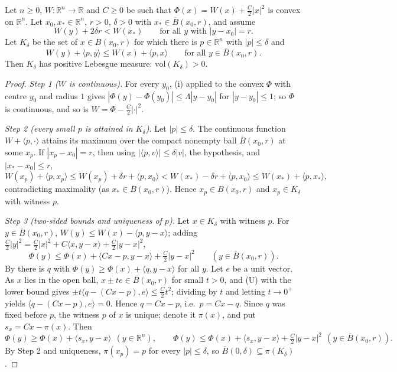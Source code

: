 \begin{lemma}
Let $n\ge0$, $W:\mathbb R^n\to\mathbb R$ and $C\ge0$ be such that $\Phi(x)=W(x)+\frac C2|x|^2$ is convex on $\mathbb R^n$. Let $x_0,x_*\in\mathbb R^n$, $r>0$, $\delta>0$ with $x_*\in\overline B(x_0,r)$, and assume
\[
W(y)+2\delta r<W(x_*)\qquad\text{for all }y\text{ with }|y-x_0|=r .
\]
Let $K_\delta$ be the set of $x\in B(x_0,r)$ for which there is $p\in\mathbb R^n$ with $|p|\le\delta$ and
\[
W(y)+\langle p,y\rangle\le W(x)+\langle p,x\rangle\qquad\text{for all }y\in\overline B(x_0,r).
\]
Then $K_\delta$ has positive Lebesgue measure: $\mathrm{vol}(K_\delta)>0$.
\end{lemma}
\begin{proof}
\emph{Step 1 ($W$ is continuous).} For every $y_0$, (i) applied to the convex $\Phi$ with centre $y_0$ and radius $1$ gives $|\Phi(y)-\Phi(y_0)|\le\Lambda|y-y_0|$ for $|y-y_0|\le1$; so $\Phi$ is continuous, and so is $W=\Phi-\frac C2|\cdot|^2$.

\emph{Step 2 (every small $p$ is attained in $K_\delta$).} Let $|p|\le\delta$. The continuous function $W+\langle p,\cdot\rangle$ attains its maximum over the compact nonempty ball $\overline B(x_0,r)$ at some $x_p$. If $|x_p-x_0|=r$, then using $|\langle p,v\rangle|\le\delta|v|$, the hypothesis, and $|x_*-x_0|\le r$,
\[
W(x_p)+\langle p,x_p\rangle\le W(x_p)+\delta r+\langle p,x_0\rangle<W(x_*)-\delta r+\langle p,x_0\rangle\le W(x_*)+\langle p,x_*\rangle,
\]
contradicting maximality (as $x_*\in\overline B(x_0,r)$). Hence $x_p\in B(x_0,r)$ and $x_p\in K_\delta$ with witness $p$.

\emph{Step 3 (two-sided bounds and uniqueness of $p$).} Let $x\in K_\delta$ with witness $p$. For $y\in\overline B(x_0,r)$, $W(y)\le W(x)-\langle p,y-x\rangle$; adding $\frac C2|y|^2=\frac C2|x|^2+C\langle x,y-x\rangle+\frac C2|y-x|^2$,
\[
\Phi(y)\le\Phi(x)+\langle Cx-p,y-x\rangle+\tfrac C2|y-x|^2\qquad(y\in\overline B(x_0,r)). \tag{U}
\]
By  there is $q$ with $\Phi(y)\ge\Phi(x)+\langle q,y-x\rangle$ for all $y$. Let $e$ be a unit vector. As $x$ lies in the open ball, $x\pm te\in\overline B(x_0,r)$ for small $t>0$, and (U) with the lower bound gives $\pm t\langle q-(Cx-p),e\rangle\le\frac C2t^2$; dividing by $t$ and letting $t\to0^+$ yields $\langle q-(Cx-p),e\rangle=0$. Hence $q=Cx-p$, i.e.\ $p=Cx-q$. Since $q$ was fixed before $p$, the witness $p$ of $x$ is unique; denote it $\pi(x)$, and put $s_x=Cx-\pi(x)$. Then
\[
\Phi(y)\ge\Phi(x)+\langle s_x,y-x\rangle\ \ (y\in\mathbb R^n),\qquad \Phi(y)\le\Phi(x)+\langle s_x,y-x\rangle+\tfrac C2|y-x|^2\ \ (y\in\overline B(x_0,r)). \tag{L,U}
\]
By Step 2 and uniqueness, $\pi(x_p)=p$ for every $|p|\le\delta$, so $\overline B(0,\delta)\subseteq\pi(K_\delta)$.


\end{proof}
